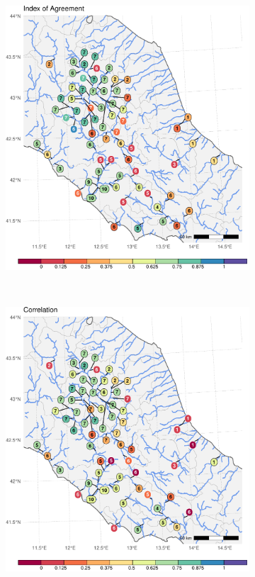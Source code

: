 \begin{figure}
    \centering
    \begin{subfigure}{0.7\textwidth}
        \includegraphics[width=\textwidth]{figures/valid_Q/metrics/intdb-fil-nc_reg3_22_d}
    \end{subfigure}\\
    \begin{subfigure}{0.7\textwidth}
        \includegraphics[width=\textwidth]{figures/valid_Q/metrics/intdb-fil-nc_reg3_22_r}

\end{subfigure}
\end{figure}
